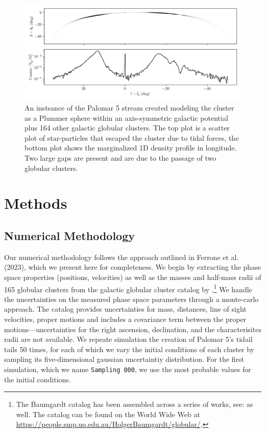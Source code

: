 \documentclass{aa}
\begin{document}
  \begin{figure}
    \centering
    \includegraphics[width=\linewidth]{stream_on_sky_Pal5_monte-carlo-009_pouliasis2017pii-GCNBody.png}
    \caption{An instsance of the Palomar 5 stream created modeling the cluster as a Plummer sphere within an axis-symmetric galactic potential plus 164 other galactic globular clusters. The top plot is a scatter plot of star-particles that escaped the cluster due to tidal forces, the bottom plot shows the marginalized 1D density profile in longitude. Two large gaps are present and are due to the passage of two globular clusters.}
    \label{fig:stream_on_sky}
    \end{figure}








\section{Methods}

  \subsection{Numerical Methodology}
    Our numerical methodology follows the approach outlined in Ferrone et al. (2023), which we present here for completeness. We begin by extracting the phase space properties (positions, velocities) as well as the masses and half-mass radii of 165 globular clusters from the galactic globular cluster catalog by \cite{2021MNRAS.505.5957B}.\footnote{The Baumgardt catalog has been assembled across a series of works, see: \cite{2020PASA...37...46B,2019MNRAS.482.5138B,2018MNRAS.478.1520B} as well. The catalog can be found on the World Wide Web at \href{https://people.smp.uq.edu.au/HolgerBaumgardt/globular/}{https://people.smp.uq.edu.au/HolgerBaumgardt/globular/}.} We handle the uncertainties on the measured phase space parameters through a monte-carlo approach. The catalog provides uncertainties for mass, distances, line of sight velocities, proper motions and includes a covariance term between the proper motions---uncertainties for the right ascension, declination, and the characterisitcs radii are not available. We repeate simulation the creation of Palomar 5's tidail tails 50 times, for each of which we vary the initial conditions of each cluster by sampling its five-dimensional gaussian uncertaintiy distribution. For the first simulation, which we name \texttt{Sampling 000}, we use the most probable values for the initial conditions. 
\end{document}
